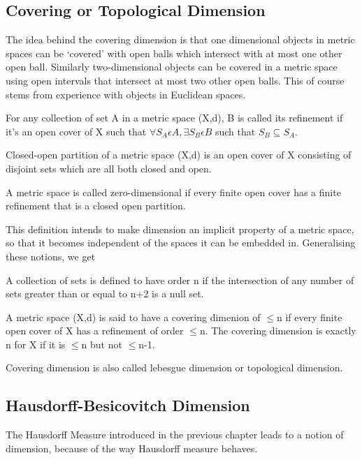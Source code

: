 \subsection{Covering or Topological Dimension}
The idea behind the covering dimension is that one dimensional objects in
metric spaces can be `covered' with open balls which intersect with at most
one other open ball. Similarly two-dimensional objects can be covered in a
metric space using open intervals that intersect at most two other open
balls. This of course stems from experience with objects in Euclidean spaces.
\begin{definition}
    For any collection of set A in a metric space (X,d), B is called its
    refinement if it's an open cover of X such that $\forall S_A \epsilon A,
    \exists S_B \epsilon B$ such that $ S_B \subseteq S_A$.
\end{definition}
\begin{definition}
    Closed-open partition of a metric space (X,d) is an open cover of X
    consisting of disjoint sets which are all both closed and open.
\end{definition}
\begin{definition}
    A metric space is called zero-dimensional if every finite open cover has a
    finite refinement that is a closed open partition.
\end{definition}
This definition intends to make dimension an implicit property of a metric
space, so that it becomes independent of the spaces it can be embedded in.
Generalising these notions, we get
\begin{definition}
    A collection of sets is defined to have order n if the intersection of any
    number of sets greater than or equal to n+2 is a null set.
\end{definition}
\begin{definition}
    A metric space (X,d) is said to have a covering dimenion of $\leqslant$n if
    every finite open cover of X has a refinement of order $\leqslant$n. The
    covering dimension is exactly n for X if it is $\leqslant$n but not
    $\leqslant$n-1.
\end{definition}
Covering dimension is also called lebesgue dimension or topological dimension.

\subsection{Hausdorff-Besicovitch Dimension}
The Hausdorff Measure introduced in the previous chapter leads to a notion of
dimension, because of the way Hausdorff measure behaves.


